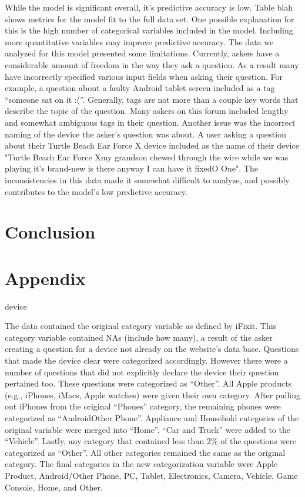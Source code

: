 \documentclass[12pt]{article}
\begin{document}
While the model is significant overall, it's predictive accuracy is low. Table blah shows metrics for the model fit to the full data set. One possible explanation for this is the high number of categorical variables included in the model. Including more quantitative variables may improve predictive accuracy. 
The data we analyzed for this model presented some limitations. Currently, askers have a considerable amount of freedom in the way they ask a question. As a result many have incorrectly specified various input fields when asking their question. For example, a question about a faulty Android tablet screen included as a tag ``someone sat on it :(''. Generally, tags are not more than a couple key words that describe the topic of the question. Many askers on this forum included lengthy and somewhat ambiguous tags in their question. Another issue was the incorrect naming of the device the asker's question was about. A user asking a question about their Turtle Beach Ear Force X device included as the name of their device "Turtle Beach Ear Force Xmy grandson chewed through the wire while we was playing it's brand-new is there anyway I can have it fixedO One". The inconsistencies in this data made it somewhat difficult to analyze, and possibly contributes to the model's low predictive accuracy. 

\section{Conclusion}




\section{Appendix} 

device

The data contained the original category variable as defined by iFixit. This category variable contained NAs (include how many), a result of the asker creating a question for a device not already on the website's data base. Questions that made the device clear were categorized accordingly. However there were a number of questions that did not explicitly declare the device their question pertained too. These questions were categorized as ``Other''. All Apple products (e.g., iPhones, iMacs, Apple watches) were given their own category. After pulling out iPhones from the original ``Phones'' category, the remaining phones were categorized as ``AndroidOther Phone''. Appliance and Household categories of the original variable were merged into ``Home''. ``Car and Truck'' were added to the ``Vehicle''. Lastly, any category that contained less than 2\% of the questions were categorized as ``Other''. All other categories remained the same as the original category. The final categories in the new categorization variable were Apple Product, Android/Other Phone, PC, Tablet, Electronics, Camera, Vehicle, Game Console, Home, and Other. 
\end{document}

